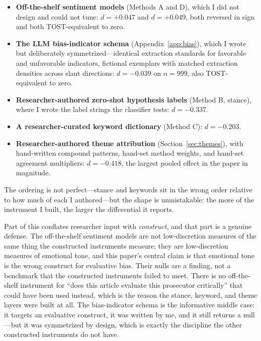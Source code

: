 \documentclass[12pt, letterpaper]{article}
\begin{document}
\begin{itemize}[nosep]
  \item \textbf{Off-the-shelf sentiment models} (Methods A and D), which I did not design and could not tune: $d = +0.047$ and $d = +0.049$, both reversed in sign and both TOST-equivalent to zero.
  \item \textbf{The LLM bias-indicator schema} (Appendix~\ref{app:bias}), which I wrote but deliberately symmetrized---identical extraction standards for favorable and unfavorable indicators, fictional exemplars with matched extraction densities across slant directions: $d = -0.039$ on $n = 999$, also TOST-equivalent to zero.
  \item \textbf{Researcher-authored zero-shot hypothesis labels} (Method B, stance), where I wrote the label strings the classifier tests: $d = -0.337$.
  \item \textbf{A researcher-curated keyword dictionary} (Method C): $d = -0.203$.
  \item \textbf{Researcher-authored theme attribution} (Section~\ref{sec:themes}), with hand-written compound patterns, hand-set method weights, and hand-set agreement multipliers: $d = -0.418$, the largest pooled effect in the paper in magnitude.
\end{itemize}

The ordering is not perfect---stance and keywords sit in the wrong order relative to how much of each I authored---but the shape is unmistakable: the more of the instrument I built, the larger the differential it reports.

Part of this conflates researcher input with \emph{construct}, and that part is a genuine defense. The off-the-shelf sentiment models are not low-discretion measures of the same thing the constructed instruments measure; they are low-discretion measures of emotional tone, and this paper's central claim is that emotional tone is the wrong construct for evaluative bias. Their nulls are a finding, not a benchmark that the constructed instruments failed to meet. There is no off-the-shelf instrument for ``does this article evaluate this prosecutor critically'' that could have been used instead, which is the reason the stance, keyword, and theme layers were built at all. The bias-indicator schema is the informative middle case: it targets an evaluative construct, it was written by me, and it still returns a null---but it was symmetrized by design, which is exactly the discipline the other constructed instruments do not have.
\end{document}
